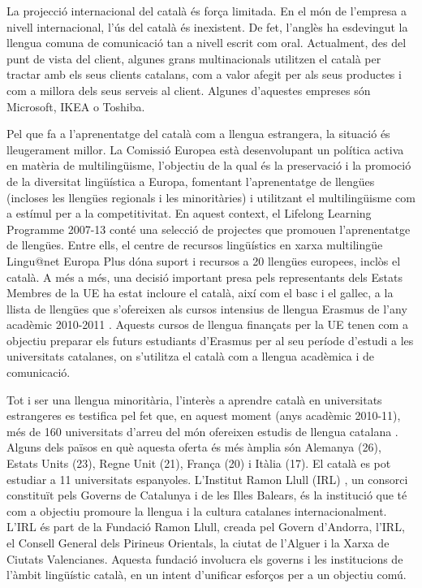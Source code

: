 \documentclass[]{../../metanetpaper}
\begin{document}
\begin{multicols}{2}
La projecció internacional del català és força limitada. En el món de l’empresa a nivell internacional, l’ús del català és inexistent. De fet, l’anglès ha esdevingut la llengua comuna de comunicació tan a nivell escrit com oral. Actualment, des del punt de vista del client, algunes grans multinacionals utilitzen el català per tractar amb els seus clients catalans, com a valor afegit per als seus productes i com a millora dels seus serveis al client. Algunes d’aquestes empreses són Microsoft, IKEA o Toshiba.

Pel que fa a l’aprenentatge del català com a llengua estrangera, la situació és lleugerament millor. La Comissió Europea està desenvolupant un política activa en matèria de multilingüisme, l’objectiu de la qual és la preservació i la promoció de la diversitat lingüística a Europa, fomentant l’aprenentatge de llengües (incloses les llengües regionals i les minoritàries) i utilitzant el multilingüisme com a estímul per a la competitivitat. En aquest context, el Lifelong Learning Programme 2007-13 conté una selecció de projectes que promouen l’aprenentatge de llengües. Entre ells, el centre de recursos lingüístics en xarxa multilingüe Lingu@net Europa Plus \cite{CAT-Nota9} dóna suport i recursos a 20 llengües europees, inclòs el català. A més a més, una decisió important presa pels representants dels Estats Membres de la UE ha estat incloure el català, així com el basc i el gallec, a la llista de llengües que s’ofereixen als cursos intensius de llengua Erasmus de l’any acadèmic 2010-2011 \cite{CAT-Nota10}. Aquests cursos de llengua finançats per la UE tenen com a objectiu preparar els futurs estudiants d’Erasmus per al seu període d’estudi a les universitats catalanes, on s’utilitza el català com a llengua acadèmica i de comunicació.

Tot i ser una llengua minoritària, l’interès a aprendre català en universitats estrangeres es testifica pel fet que, en aquest moment (anys acadèmic 2010-11), més de 160 universitats d’arreu del món ofereixen estudis de llengua catalana \cite{CAT-Nota11}. Alguns dels països en què aquesta oferta és més àmplia són Alemanya (26), Estats Units (23), Regne Unit (21), França (20) i Itàlia (17). El català es pot estudiar a 11 universitats espanyoles. L’Institut Ramon Llull (IRL) \cite{CAT-Nota12}, un consorci constituït pels Governs de Catalunya i de les Illes Balears, és la institució que té com a objectiu promoure la llengua i la cultura catalanes internacionalment. L’IRL és part de la Fundació Ramon Llull, creada pel Govern d’Andorra, l’IRL, el Consell General dels Pirineus Orientals, la ciutat de l’Alguer i la Xarxa de Ciutats Valencianes. Aquesta fundació involucra els governs i les institucions de l’àmbit lingüístic català, en un intent d’unificar esforços per a un objectiu comú.


\end{multicols}
\end{document}
